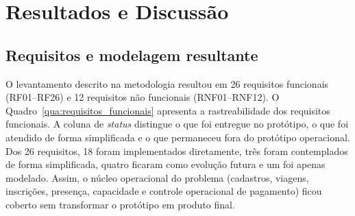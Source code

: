 \documentclass[a4paper,12pt]{article}
\begin{document}
\section{Resultados e Discussão}
\label{sec:resultados}

\subsection{Requisitos e modelagem resultante}
\label{sec:requisitos}
\label{sec:modelagem}

O levantamento descrito na metodologia resultou em 26 requisitos funcionais (RF01--RF26) e 12 requisitos não funcionais (RNF01--RNF12). O Quadro~\ref{qua:requisitos_funcionais} apresenta a rastreabilidade dos requisitos funcionais. A coluna de \textit{status} distingue o que foi entregue no protótipo, o que foi atendido de forma simplificada e o que permaneceu fora do protótipo operacional. Dos 26 requisitos, 18 foram implementados diretamente, três foram contemplados de forma simplificada, quatro ficaram como evolução futura e um foi apenas modelado. Assim, o núcleo operacional do problema (cadastros, viagens, inscrições, presença, capacidade e controle operacional de pagamento) ficou coberto sem transformar o protótipo em produto final.
\end{document}
